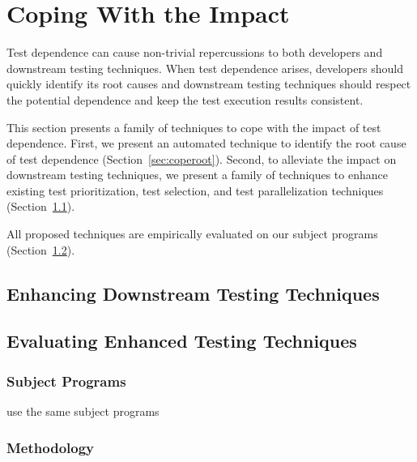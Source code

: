 \section{Coping With the Impact}
\label{sec:cope}

Test dependence can cause non-trivial repercussions
to both developers and downstream testing techniques.
When test dependence arises, developers should quickly
identify its root causes and downstream testing techniques
should respect the potential dependence and keep the
test execution results consistent.

This section presents a family of techniques to cope with the
impact of test dependence. First, we present an automated
technique to identify the root cause of test dependence
(Section~\ref{sec:coperoot}). Second, to alleviate the
impact on downstream testing techniques, we present a family
of techniques to enhance existing test prioritization,
test selection, and test parallelization techniques (Section~\ref{sec:copeenhance}).

All proposed techniques are empirically evaluated on
our subject programs (Section~\ref{sec:evaluation}).


\subsection{Enhancing Downstream Testing Techniques}
\label{sec:copeenhance}




\subsection{Evaluating Enhanced Testing Techniques}

\label{sec:evaluation}

\subsubsection{Subject Programs}

use the same subject programs

\subsubsection{Methodology}


